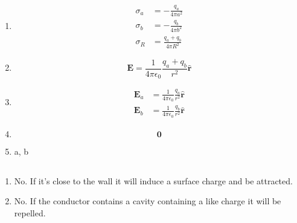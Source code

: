 \documentclass{article}
\renewcommand{\vec}[1]{\boldsymbol{\mathbf{#1}}}
\newcommand{\uvec}[1]{\hat{\vec{#1}}}
\newcommand{\ke}{\frac{1}{4 \pi \epsilon_0}}
\begin{document}
\subsection{}

\begin{enumerate}
  \item

        \begin{align*}
          \sigma_a & = -\frac{q_a}{4 \pi a^2}      \\
          \sigma_b & = -\frac{q_b}{4 \pi b^2}      \\
          \sigma_R & = \frac{q_a + q_b}{4 \pi R^2}
        \end{align*}

  \item \[\vec{E} = \ke \frac{q_a + q_b}{r^2} \uvec{r}\]

  \item

        \begin{align*}
          \vec{E}_a & = \ke \frac{q_a}{r^2} \uvec{r} \\
          \vec{E}_b & = \ke \frac{q_b}{r^2} \uvec{r}
        \end{align*}

  \item \[\vec{0}\]

  \item a, b
\end{enumerate}

\subsection{}

\begin{enumerate}
  \item No. If it's close to the wall it will induce a surface charge and be attracted.

  \item No. If the conductor contains a cavity containing a like charge it will be repelled.
\end{enumerate}

\subsection{}
\end{document}
